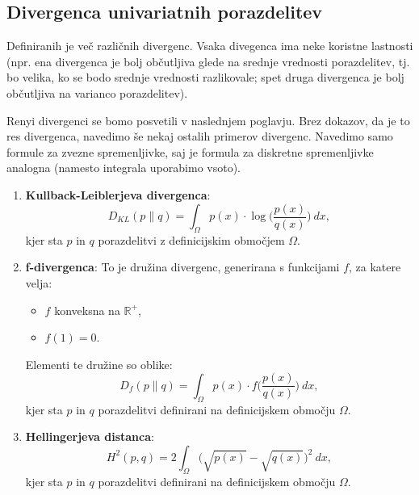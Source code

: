 \subsection{Divergenca univariatnih porazdelitev}

Definiranih je več različnih divergenc. Vsaka divegenca ima neke koristne lastnosti (npr. ena divergenca je bolj občutljiva glede na srednje vrednosti porazdelitev, tj. bo velika, ko se bodo srednje vrednosti razlikovale; spet druga divergenca je bolj občutljiva na varianco porazdelitev).

Renyi divergenci se bomo posvetili v naslednjem poglavju. Brez dokazov, da je to res divergenca, navedimo še nekaj ostalih primerov divergenc. Navedimo samo formule za zvezne spremenljivke, saj je formula za diskretne spremenljivke analogna (namesto integrala uporabimo vsoto).

\begin{zgled}
	\leavevmode
	\begin{enumerate}
		\item \textbf{Kullback-Leiblerjeva divergenca}:
		\begin{equation}
			D_{KL}(p \| q) = \int_\Omega p(x) \cdot \log\Big(\frac{p(x)}{q(x)}\Big) \  dx,
		\end{equation}
		kjer sta $p$ in $q$ porazdelitvi z definicijskim območjem $\Omega$.
		\item \textbf{f-divergenca}:
		To je družina divergenc, generirana s funkcijami $f$, za katere velja:
		\begin{itemize}
			\item $f$ konveksna na $\mathbb{R}^+$,
			\item $f(1) = 0$.
		\end{itemize}
		Elementi te družine so oblike:
		\begin{equation}
			D_f(p \| q) = \int_\Omega p(x) \cdot f\Big(\frac{p(x)}{q(x)}\Big) \  dx,
		\end{equation}
		kjer sta $p$ in $q$ porazdelitvi definirani na definicijskem območju $\Omega$.
		\item \textbf{Hellingerjeva distanca}:
		\begin{equation}
			H^2(p, q) = 2 \int_\Omega \Big(\sqrt{p(x)} - \sqrt{q(x)}\Big)^2 \  dx,
		\end{equation}
		kjer sta $p$ in $q$ porazdelitvi definirani na definicijskem območju $\Omega$.
	\end{enumerate}
\end{zgled}